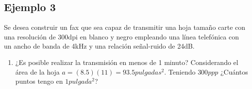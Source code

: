\documentclass{article}
\begin{document}
\subsection{Ejemplo 3}

Se desea construir un fax que sea capaz de transmitir una hoja tamaño carte con una resolución de 300\si{dpi} en blanco y negro empleando una línea telefónica con un ancho de banda de 4\si{\kilo\hertz} y una relación señal-ruido de 24\si{dB}.

\begin{enumerate}
  \item ¿Es posible realizar la transmisión en menos de 1 minuto? Considerando el área de la hoja $a = (8.5)(11) = 93.5 \si{pulgadas^{2}}$. Teniendo $300ppp$ ¿Cuántos puntos tengo en $1\si{pulgada^{2}}$?
\end{enumerate}
\end{document}
